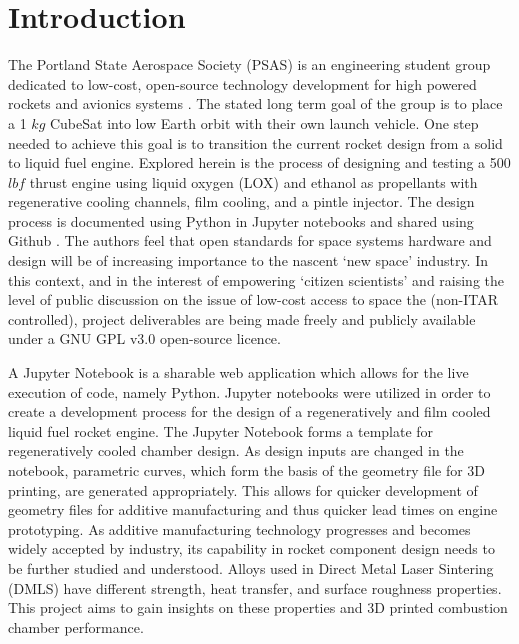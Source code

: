 \documentclass[]{aiaa-tc}%
\begin{document}
\section{Introduction}
The Portland State Aerospace Society (PSAS) is an engineering student group dedicated to low-cost, open-source technology development for high powered rockets and avionics systems \cite{PSAS}. The stated long term goal of the group is to place a 1 $kg$ CubeSat into low Earth orbit with their own launch vehicle. One step needed to achieve this goal is to transition the current rocket design from a solid to liquid fuel engine. Explored herein is the process of designing and testing a 500 $lbf$ thrust engine using liquid oxygen (LOX) and ethanol as propellants with regenerative cooling channels, film cooling, and a pintle injector. The design process is documented using Python in Jupyter notebooks and shared using Github \cite{git}. The authors feel that open standards for space systems hardware and design will be of increasing importance to the nascent `new space' industry. In this context, and in the interest of empowering `citizen scientists' and raising the level of public discussion on the issue of low-cost access to space the (non-ITAR controlled), project deliverables are being made freely and publicly available under a GNU GPL v3.0 open-source licence. 

A Jupyter Notebook is a sharable web application which allows for the live execution of code, namely Python. Jupyter notebooks were utilized in order to create a development process for the design of a regeneratively and film cooled liquid fuel rocket engine. The Jupyter Notebook forms a template for regeneratively cooled chamber design. As design inputs are changed in the notebook, parametric curves, which form the basis of the geometry file for 3D printing, are generated appropriately. This allows for quicker development of geometry files for additive manufacturing and thus quicker lead times on engine prototyping. As additive manufacturing technology progresses and becomes widely accepted by industry, its capability in rocket component design needs to be further studied and understood. Alloys used in Direct Metal Laser Sintering (DMLS) have different strength, heat transfer, and surface roughness properties. This project aims to gain insights on these properties and 3D printed combustion chamber performance. 


\end{document}
